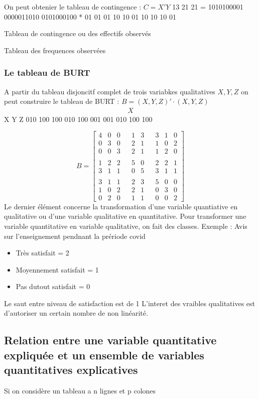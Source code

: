\documentclass[a4paper]{article}
\begin{document}
On peut obtenier le tableau de contingence : $C = X'Y$
13 21 21
=
1010100001 0000011010 0101000100
*
01 01 01 10 10 01 10 10 10 01

Tableau de contingence ou des effectifs observés

Tableau des frequences observées

\subsubsection{Le tableau de BURT}
A partir du tableau disjoncitf complet de trois variabkes qualitatives $X, Y , Z$ on peut construire le tableau de BURT : $B = (X,Y,Z)' \cdot (X,Y,Z)$
\begin{align*}
    X 
\end{align*}
X
Y
Z 010 100 100 010 100 001 001 010 100 100

\begin{equation*}
    B = 
    \begin{bmatrix}
        4&0&0& &1&3& &3&1&0 \\
        0&3&0& &2&1& &1&0&2 \\
        0&0&3& &2&1& &1&2&0 \\
        \\
        1&2&2& &5&0& &2&2&1 \\
        3&1&1& &0&5& &3&1&1 \\
        \\ 
        3&1&1& &2&3& &5&0&0 \\
        1&0&2& &2&1& &0&3&0 \\
        0&2&0& &1&1& &0&0&2 
\end{bmatrix} 
\end{equation*}
Le dernier élément concerne la transformation d'une variable quantiative en qualitative ou d'une variable qualitative en quantitative.
Pour transformer une variable quantitative en variable qualitative, on fait des classes.
Exemple :
Avis sur l'enseignement pendnant la prériode covid
\begin{itemize}
    \item Très satisfait = 2
    \item Moyennement satisfait = 1
    \item Pas dutout satisfait = 0
\end{itemize}
Le saut entre niveau de satisfaction est de 1
L'interet des vraibles qualitatives est d'autoriser un certain nombre de non linéarité. 

\subsection{Relation entre une variable quantitative expliquée et un ensemble de variables quantitatives explicatives}
Si on considère un tableau a n lignes et p colones
\end{document}
